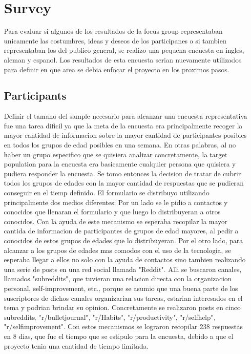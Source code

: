 \section{Survey}
Para evaluar si algunos de los resultados de la focus group representaban unicamente las costumbres, ideas y deseos de los participanes o si tambien representaban los del publico general, se realizo una pequena encuesta en ingles, aleman y espanol. Los resultados de esta encuesta serian nuevamente utilizados para definir en que area se debia enfocar el proyecto en los proximos pasos.\\

\subsection{Participants}
Definir el tamano del sample necesario para alcanzar una encuesta representativa fue una tarea dificil ya que la meta de la encuesta era principalmente recoger la mayor cantidad de informacion sobre la mayor cantidad de participantes posibles en todos los grupos de edad posibles en una semana. En otras palabras, al no haber un grupo especifico que se quisiera analizar concretamente, la target population para la encuesta era basicamente cualquier persona que quisiera y pudiera responder la encuesta. Se tomo entonces la decision de tratar de cubrir todos los grupos de edades con la mayor cantidad de respuestas que se pudieran conseguir en el tiemp definido. El formulario se distribuyo utilizando principalmente dos medios diferentes: Por un lado se le pidio a contactos y conocidos que llenaran el formulario y que luego lo distribuyeran a otros conocidos. Con la ayuda de este mecanismo se esperaba recopilar la mayor cantida de informacion de participantes de grupos de edad mayores, al pedir a conocidos de estos grupos de edades que lo distribuyeran. Por el otro lado, para alcanzar a los grupos de edades mas comodos con el uso de la tecnologia, se esperaba llegar a ellos no solo con la ayuda de contactos sino tambien realizando una serie de posts en una red social llamada "Reddit". Alli se buscaron canales, llamados "subreddits", que tuvieran una relacion directa con la organizacion personal, self-improvement, etc., porque se asumio que una buena parte de los suscriptores de dichos canales organizarian sus tareas, estarian interesados en el tema y podrian brindar su opinion. Concretamente se realizaron posts en cinco subreddits, "r/bulletjournal", "r/Habits", "r/productivity", "r/selfhelp", "r/selfimprovement". Con estos mecanismos se lograron recopilar 238 respuestas en 8 dias, que fue el tiempo que se estipulo para la encuesta, debido a que el proyecto tenia una cantidad de tiempo limitada.\\

